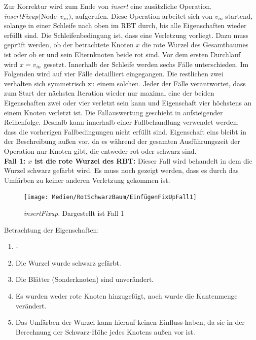 \documentclass[a4paper,12pt]{article}
\begin{document}
\noindent Zur Korrektur wird zum Ende von \textit{insert} eine zusätzliche Operation,\\  \mbox{\textit{insertFixup}$($Node $v_{in})$}, aufgerufen. Diese Operation arbeitet sich von $v_{in}$ startend, solange in einer Schleife nach oben im RBT durch, bis alle Eigenschaften wieder erfüllt sind. Die Schleifenbedingung ist, dass eine Verletzung vorliegt. Dazu muss geprüft werden, ob der betrachtete Knoten $x$ die rote Wurzel des Gesamtbaumes ist oder ob er und sein Elternknoten beide rot sind. Vor dem ersten Durchlauf wird $x = v_{in}$ gesetzt. Innerhalb der Schleife werden sechs Fälle unterschieden. Im Folgenden wird auf vier Fälle detailliert eingegangen. Die restlichen zwei verhalten sich symmetrisch zu einem solchen. Jeder der Fälle verantwortet, dass zum Start der nächsten Iteration wieder nur maximal eine der beiden Eigenschaften zwei oder vier verletzt sein kann und Eigenschaft vier höchstens an einem Knoten verletzt ist. Die Fallauswertung geschieht in aufsteigender Reihenfolge. Deshalb kann innerhalb einer Fallbehandlung verwendet werden, dass die vorherigen Fallbedingungen nicht erfüllt sind. Eigenschaft eins bleibt in der Beschreibung außen vor, da es während der gesamten Ausführungszeit der Operation nur Knoten gibt, die entweder rot oder schwarz sind. \\

\noindent\textbf{Fall 1: $x$ ist die rote Wurzel des RBT: }
Dieser Fall wird behandelt in dem die Wurzel schwarz gefärbt wird. Es muss noch gezeigt werden, dass es durch das Umfärben zu keiner anderen Verletzung gekommen ist.\\
\begin{figure}[H]
	\centering
	\texttt{[image: Medien/RotSchwarzBaum/EinfügenFixUpFall1]}
	\caption{\textit{insertFixup}. Dargestellt ist Fall 1  }
	\label{fig:EinfügenFixUpFall1}
\end{figure}

Betrachtung der Eigenschaften:
\begin{enumerate}
	\item -
	\item Die Wurzel wurde schwarz gefärbt.
	\item Die Blätter (Sonderknoten) sind unverändert.
	\item Es wurden weder rote Knoten hinzugefügt, noch wurde die Kantenmenge verändert. 
	\item Das Umfärben der Wurzel kann hierauf keinen Einfluss haben, da sie in der Berechnung der Schwarz-Höhe jedes Knotens außen vor ist.
\end{enumerate}  
\end{document}
